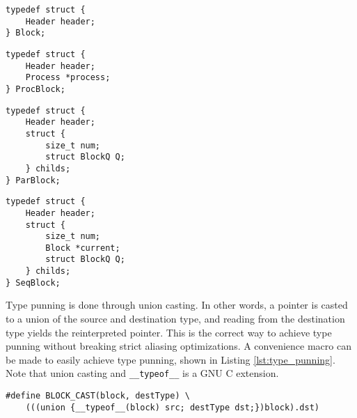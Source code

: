 \noindent\begin{minipage}{.45\textwidth}
\begin{lstlisting}[caption={Generic Block struct type},style={CustomC},label={lst:block_struct_type}]
typedef struct {
    Header header;
} Block;
\end{lstlisting}
\end{minipage}\hfill
\begin{minipage}{.45\textwidth}
\begin{lstlisting}[caption={\texttt{PROC} Block struct type},style={CustomC},label={lst:procblock_struct_type}]
typedef struct {
    Header header;
    Process *process;
} ProcBlock;
\end{lstlisting}
\end{minipage}
\noindent\begin{minipage}{.45\textwidth}
\begin{lstlisting}[caption={\texttt{PAR} Block struct type},style={CustomC},label={lst:parblock_struct_type}]
typedef struct {
    Header header;
    struct {
        size_t num;
        struct BlockQ Q;
    } childs;
} ParBlock;
\end{lstlisting}
\end{minipage}\hfill
\begin{minipage}{.45\textwidth}
\begin{lstlisting}[caption={\texttt{SEQ} Block struct type},style={CustomC},label={lst:seqblock_struct_type}]
typedef struct {
    Header header;
    struct {
        size_t num;
        Block *current;
        struct BlockQ Q;
    } childs;
} SeqBlock;
\end{lstlisting}
\end{minipage}

Type punning is done through union casting. In other words, a pointer is casted to a union of the source and destination type, and reading from the destination type yields the reinterpreted pointer. This is the correct way to achieve type punning without breaking strict aliasing optimizations. A convenience macro can be made to easily achieve type punning, shown in Listing \ref{lst:type_punning}. Note that union casting and \texttt{\_\_typeof\_\_} is a GNU C extension.

\begin{lstlisting}[style={CustomC},caption={Type punning through union cast},label={lst:type_punning}]
#define BLOCK_CAST(block, destType) \
    (((union {__typeof__(block) src; destType dst;})block).dst)
\end{lstlisting}

